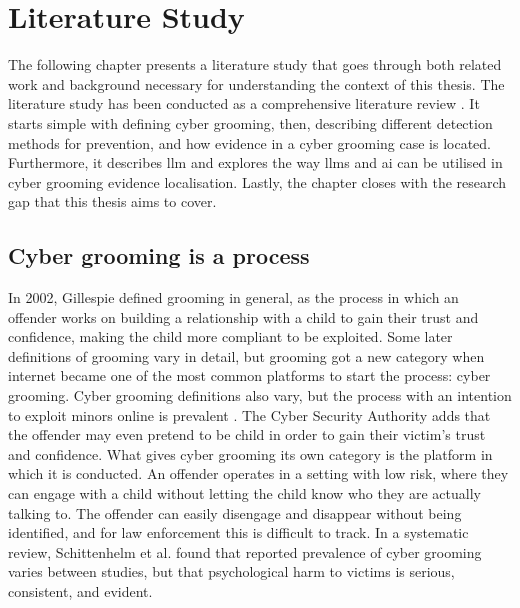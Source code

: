 \chapter{Literature Study}
\label{chapter:literature-study}
The following chapter presents a literature study that goes through both related work and background necessary for understanding the context of this thesis. The literature study has been conducted as a comprehensive literature review \cite{williams2018}. It starts simple with defining cyber grooming, then, describing different detection methods for prevention, and how evidence in a cyber grooming case is located. Furthermore, it describes \gls{llm} and explores the way \gls{llm}s and \gls{ai} can be utilised in cyber grooming evidence localisation. Lastly, the chapter closes with the research gap that this thesis aims to cover. 

\section{Cyber grooming is a process}
\label{literature-study:cyber-grooming}
In 2002, Gillespie \cite{gillespie2002} defined grooming in general, as the process in which an offender works on building a relationship with a child to gain their trust and confidence, making the child more compliant to be exploited. Some later definitions of grooming vary in detail, but grooming got a new category when internet became one of the most common platforms to start the process: cyber grooming. Cyber grooming definitions also vary, but the process with an intention to exploit minors online is prevalent \cite{klicksafe2026, nspcc2026, childsafenet2026, canada2026}. The Cyber Security Authority \cite{CSA2026} adds that the offender may even pretend to be child in order to gain their victim's trust and confidence. What gives cyber grooming its own category is the platform in which it is conducted. An offender operates in a setting with low risk, where they can engage with a child without letting the child know who they are actually talking to. The offender can easily disengage and disappear without being identified, and for law enforcement this is difficult to track. In a systematic review, Schittenhelm et al. \cite{schittenhelm2025} found that reported prevalence of cyber grooming varies between studies, but that psychological harm to victims is serious, consistent, and evident. 

